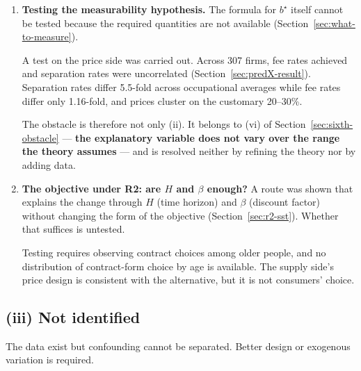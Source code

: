 \begin{enumerate}[label=(\arabic*),start=2]
\item \textbf{Testing the measurability hypothesis.}
The formula for $b^\star$ itself cannot be tested because the required quantities are not
available (Section~\ref{sec:what-to-measure}).

A test on the price side was carried out. Across 307 firms, fee rates achieved and separation
rates were uncorrelated (Section~\ref{sec:predX-result}). Separation rates differ 5.5-fold
across occupational averages while fee rates differ only 1.16-fold, and prices cluster on the
customary 20--30\%.

The obstacle is therefore not only (ii). It belongs to (vi) of
Section~\ref{sec:sixth-obstacle} --- \textbf{the explanatory variable does not vary over the
range the theory assumes} --- and is resolved neither by refining the theory nor by adding
data.

\item \textbf{The objective under R2: are $H$ and $\beta$ enough?}
A route was shown that explains the change through $H$ (time horizon) and $\beta$ (discount
factor) without changing the form of the objective (Section~\ref{sec:r2-sst}). Whether that
suffices is untested.

Testing requires observing contract choices among older people, and no distribution of
contract-form choice by age is available. The supply side's price design is consistent with
the alternative, but it is not consumers' choice.
\end{enumerate}

\subsection{(iii) Not identified}

The data exist but confounding cannot be separated. Better design or exogenous variation is
required.

